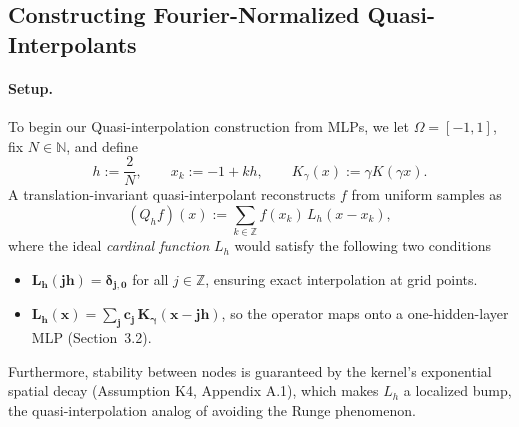 \documentclass{article}
\begin{document}
\subsection{Constructing Fourier-Normalized Quasi-Interpolants}
\label{subsec:fourier-normalized}

\paragraph{Setup.} To begin our Quasi-interpolation construction from MLPs, we let \(\Omega = [-1,1]\), fix \(N \in \mathbb{N}\), and define
\begin{equation}
h := \frac{2}{N}, \qquad x_k := -1 + kh, \qquad K_\gamma(x) := \gamma K(\gamma x).
\label{eq:grid-kernel}
\end{equation}
A translation-invariant quasi-interpolant reconstructs \(f\) from uniform samples as
\begin{equation}
(Q_h f)(x) := \sum_{k \in \mathbb{Z}} f(x_k)\, L_h(x - x_k),
\label{eq:Qh}
\end{equation}
where the ideal \emph{cardinal function} \(L_h\) would satisfy the following two conditions
\begin{itemize}
    \item[\textbf{(i)}] \(\boldsymbol{L_h(jh) = \delta_{j,0}}\) for all \(j \in \mathbb{Z}\), ensuring exact interpolation at grid points.
    \item[\textbf{(ii)}] \(\boldsymbol{L_h(x) = \sum_j c_j\, K_\gamma(x - jh)}\), so the operator maps onto a one-hidden-layer MLP (Section~3.2).
\end{itemize}
Furthermore, stability between nodes is guaranteed by the kernel's exponential spatial decay (Assumption K4, Appendix A.1), which makes \(L_h\) a localized bump, the quasi-interpolation analog of avoiding the Runge phenomenon.
\end{document}
